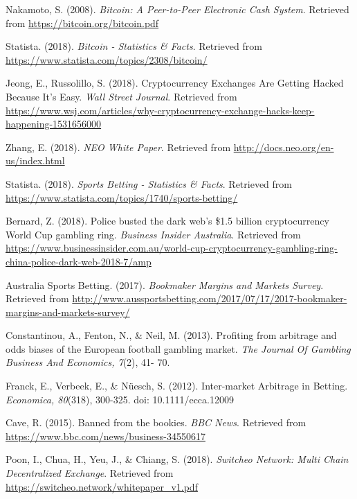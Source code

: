 \documentclass{article}
\begin{document}
\begin{thebibliography}{16}

	Nakamoto, S. (2008). 
	\textit{Bitcoin: A Peer-to-Peer Electronic Cash System}. 
	Retrieved from \url{https://bitcoin.org/bitcoin.pdf}
	
	Statista. (2018). 
	\textit{Bitcoin - Statistics \& Facts}.
	Retrieved from \url{https://www.statista.com/topics/2308/bitcoin/}
  
	Jeong, E., Russolillo, S. (2018). Cryptocurrency Exchanges Are Getting Hacked Because It's Easy. 
	\textit{Wall Street Journal}.
	Retrieved from \url{https://www.wsj.com/articles/why-cryptocurrency-exchange-hacks-keep-happening-1531656000}
	
	Zhang, E. (2018). 
	\textit{NEO White Paper}. 
	Retrieved from \url{http://docs.neo.org/en-us/index.html}

	Statista. (2018). 
	\textit{Sports Betting - Statistics \& Facts}.
	Retrieved from \url{https://www.statista.com/topics/1740/sports-betting/}
	
	Bernard, Z. (2018). Police busted the dark web's \$1.5 billion cryptocurrency World Cup gambling ring. 
	\textit{Business Insider Australia}. 
	Retrieved from \url{https://www.businessinsider.com.au/world-cup-cryptocurrency-gambling-ring-china-police-dark-web-2018-7/amp}
	
	Australia Sports Betting. (2017). 
	\textit{Bookmaker Margins and Markets Survey}. 
	Retrieved from \url{http://www.aussportsbetting.com/2017/07/17/2017-bookmaker-margins-and-markets-survey/}
	
	Constantinou, A., Fenton, N., \& Neil, M. (2013). 
	Profiting from arbitrage and odds biases of the European football gambling market. 
	\textit{The Journal Of Gambling Business And Economics, 7}(2), 41- 70.
	
	Franck, E., Verbeek, E., \& Nüesch, S. (2012). 
	Inter-market Arbitrage in Betting. 
	\textit{Economica, 80}(318), 300-325. doi: 10.1111/ecca.12009
	
	Cave, R. (2015). Banned from the bookies. 
	\textit{BBC News}. 
	Retrieved from \url{https://www.bbc.com/news/business-34550617}
	
	Poon, I., Chua, H., Yeu, J., \& Chiang, S. (2018). 
	\textit{Switcheo Network: Multi Chain Decentralized Exchange}. 
	Retrieved from \url{https://switcheo.network/whitepaper\_v1.pdf}
	

\end{thebibliography}
\end{document}
